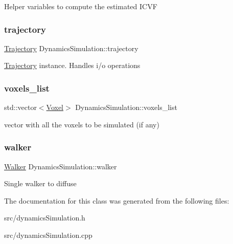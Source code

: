 Helper variables to compute the estimated I\+C\+VF \mbox{\label{class_dynamics_simulation_ab69fedf7129784621eec440ba873218d}} 
\subsubsection{\texorpdfstring{trajectory}{trajectory}}
{\footnotesize\ttfamily \hyperlink{class_trajectory}{Trajectory} Dynamics\+Simulation\+::trajectory}

\hyperlink{class_trajectory}{Trajectory} instance. Handles i/o operations \mbox{\label{class_dynamics_simulation_ab68d71822661c3608bde4553392c9bd1}} 
\subsubsection{\texorpdfstring{voxels\+\_\+list}{voxels\_list}}
{\footnotesize\ttfamily std\+::vector$<$\hyperlink{class_voxel}{Voxel}$>$ Dynamics\+Simulation\+::voxels\+\_\+list}

vector with all the voxels to be simulated (if any) \mbox{\label{class_dynamics_simulation_a9a5d2596527abdcdd185430c97dea9ad}} 
\subsubsection{\texorpdfstring{walker}{walker}}
{\footnotesize\ttfamily \hyperlink{class_walker}{Walker} Dynamics\+Simulation\+::walker}

Single walker to diffuse 

The documentation for this class was generated from the following files\+:\begin{DoxyCompactItemize}
\item 
src/dynamics\+Simulation.\+h\item 
src/dynamics\+Simulation.\+cpp\end{DoxyCompactItemize}
